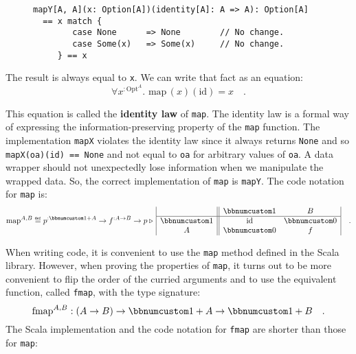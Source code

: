 \begin{wrapfigure}{l}{0.58\columnwidth}%
\vspace{-0.6\baselineskip}
\begin{lstlisting}
mapY[A, A](x: Option[A])(identity[A]: A => A): Option[A]
  == x match {
        case None      => None        // No change.
        case Some(x)   => Some(x)     // No change.
     } == x
\end{lstlisting}
\vspace{0.1\baselineskip}
\end{wrapfigure}%

\noindent The result is always equal to \lstinline!x!. We can write
that fact as an equation:\vspace{-0.3\baselineskip}
\[
\forall x^{:\text{Opt}^{A}}.\,\,\text{map}\,(x)(\text{id})=x\quad.
\]
\vspace{-0.85\baselineskip}

\noindent This equation is called the \textbf{identity law}
of \lstinline!map!. The identity law is a formal way of expressing
the information-preserving property of the \lstinline!map! function.
The implementation \lstinline!mapX! violates the identity law since
it always returns \lstinline!None! and so \lstinline!mapX(oa)(id) == None!
and not equal to \lstinline!oa! for arbitrary values of \lstinline!oa!.
A data wrapper should not unexpectedly lose information when we manipulate
the wrapped data. So, the correct implementation of \lstinline!map!
is \lstinline!mapY!. The code notation for \lstinline!map! is:\vspace{-0.4\baselineskip}
\[
\text{map}^{A,B}\triangleq p^{:\bbnum 1+A}\rightarrow f^{:A\rightarrow B}\rightarrow p\triangleright\,\begin{array}{|c||cc|}
 & \bbnum 1 & B\\
\hline \bbnum 1 & \text{id} & \bbnum 0\\
A & \bbnum 0 & f
\end{array}\quad.
\]

When writing code, it is convenient to use the \lstinline!map! method
defined in the Scala library. However, when proving the properties
of \lstinline!map!, it turns out to be more convenient to flip the
order of the curried arguments and to use the equivalent function,
called \lstinline!fmap!, with the type signature:
\[
\text{fmap}^{A,B}:\left(A\rightarrow B\right)\rightarrow\bbnum 1+A\rightarrow\bbnum 1+B\quad.
\]
The Scala implementation and the code notation for \lstinline!fmap!
are shorter than those for \lstinline!map!:

